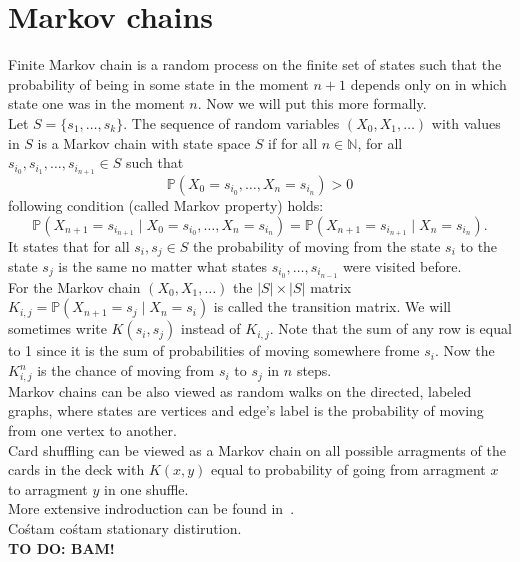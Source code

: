 \documentclass[a4paper, 12pt]{report}
\newcommand{\todo}[1]{\hfill \break \textbf{\Huge TO DO: #1 \hfill \break}\normalsize}
\begin{document}
\chapter{Markov chains}
\setcounter{page}{5}
Finite Markov chain is a random process on the finite set of states such that
the probability of being in some state in the moment $n+1$ depends only on in which state one was
in the moment $n$. Now we will put this more formally.\\
Let $S = \{s_1, \dots, s_k\}$. The sequence of random variables $(X_0, X_1, \dots)$ with values in $S$
is a Markov chain with state space $S$ if for all $n \in \mathbb{N}$,
for all $s_{i_0}, s_{i_1}, \dots, s_{i_{n+1}} \in S$ such that
\begin{equation*}
\mathbb{P}(X_0 = s_{i_0}, \dots, X_n = s_{i_n}) > 0
\end{equation*}
following condition (called Markov property) holds:
\begin{equation}
\mathbb{P}(X_{n+1} = s_{i_{n+1}} \mid X_0 = s_{i_0}, \dots, X_n = s_{i_n}) =
\mathbb{P}(X_{n+1} = s_{i_{n+1}} \mid X_n = s_{i_n}).
\end{equation}
It states that for all $s_i, s_j \in S$ the probability of moving from the state
$s_i$ to the state $s_j$ is the same no matter what states $s_{i_0}, \dots, s_{i_{n-1}}$
were visited before. \\
For the Markov chain $(X_0, X_1, \dots)$ the $|S| \times |S|$ matrix
$K_{i,j} = \mathbb{P}(X_{n+1} = s_j \mid X_n = s_i)$ is called the transition matrix. We will sometimes
write $K(s_i, s_j)$ instead of $K_{i,j}$. Note that the sum of
any row is equal to 1 since it is the sum of probabilities of moving somewhere frome $s_i$.
Now the $K^n_{i,j}$ is the chance of moving from $s_i$ to $s_j$ in $n$ steps. \\
Markov chains can be also viewed as random walks on the directed, labeled graphs, where states are vertices
and edge's label is the probability of moving from one vertex to another. \\
Card shuffling can be viewed as a Markov chain on all possible arragments of the cards
in the deck with $K(x,y)$ equal to probability of going from arragment $x$ to arragment $y$ in one shuffle. 
\\ More extensive indroduction can be found in~\cite{LePeWi}. \\
Cośtam cośtam stationary distirution. \\
\todo{BAM!}
\end{document}
